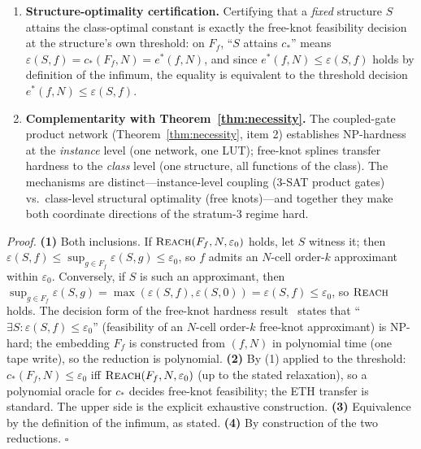\begin{theorem}
\begin{enumerate}
    verification cost asserts.
    \item \textbf{Structure-optimality certification.} Certifying that
    a \emph{fixed} structure $S$ attains the class-optimal constant is
    exactly the free-knot feasibility decision at the structure's own
    threshold: on $F_f$, ``$S$ attains $c_*$'' means
    $\varepsilon(S, f) = c_*(F_f, N) = e^*(f, N)$, and since
    $e^*(f, N) \leq \varepsilon(S, f)$ holds by definition of the
    infimum, the equality is equivalent to the threshold decision
    $e^*(f, N) \leq \varepsilon(S, f)$.
    \item \textbf{Complementarity with
    Theorem~\ref{thm:necessity}.} The coupled-gate product network
    (Theorem~\ref{thm:necessity}, item 2) establishes NP-hardness at
    the \emph{instance} level (one network, one LUT); free-knot
    splines transfer hardness to the \emph{class} level (one
    structure, all functions of the class). The mechanisms are
    distinct---instance-level coupling (3-SAT product gates) vs.\
    class-level structural optimality (free knots)---and together they
    make both coordinate directions of the stratum-3 regime hard.
\end{enumerate}
\end{theorem}

\vspace{2pt}
\noindent\textit{Proof.}
\textbf{(1)} Both inclusions. If $\textsc{Reach}(F_f, N,
\varepsilon_0)$ holds, let $S$ witness it; then $\varepsilon(S, f)
\leq \sup_{g \in F_f} \varepsilon(S, g) \leq \varepsilon_0$, so $f$
admits an $N$-cell order-$k$ approximant within $\varepsilon_0$.
Conversely, if $S$ is such an approximant, then
$\sup_{g \in F_f} \varepsilon(S, g) = \max(\varepsilon(S, f),
\varepsilon(S, 0)) = \varepsilon(S, f) \leq \varepsilon_0$, so
$\textsc{Reach}$ holds. The decision form of the free-knot hardness
result~\cite{beliakov2004least} states that ``$\exists S :
\varepsilon(S, f) \leq \varepsilon_0$'' (feasibility of an
$N$-cell order-$k$ free-knot approximant) is NP-hard; the embedding
$F_f$ is constructed from $(f, N)$ in polynomial time (one tape
write), so the reduction is polynomial. \textbf{(2)} By (1) applied
to the threshold: $c_*(F_f, N) \leq \varepsilon_0$ iff
$\textsc{Reach}(F_f, N, \varepsilon_0)$ (up to the stated relaxation),
so a polynomial oracle for $c_*$ decides free-knot feasibility; the
ETH transfer is standard. The upper side is the explicit exhaustive
construction. \textbf{(3)} Equivalence by the definition of the
infimum, as stated. \textbf{(4)} By construction of the two
reductions. $\square$

